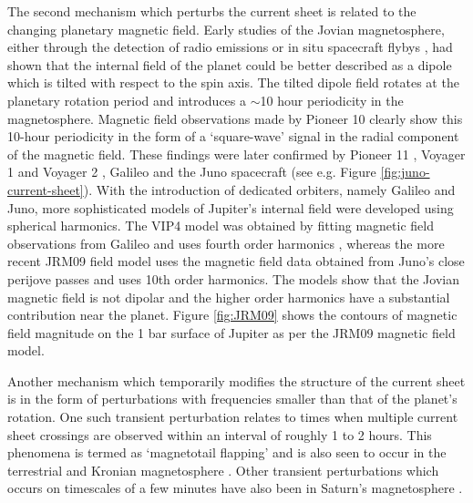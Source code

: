 The second mechanism which perturbs the current sheet is related to the changing planetary magnetic field. Early studies of the Jovian magnetosphere, either through the detection of radio emissions \cite{Carr1969TheJupiter} or in situ spacecraft flybys \cite{Smith1974The10}, had shown that the internal field of the planet could be better described as a dipole which is tilted with respect to the spin axis. The tilted dipole field rotates at the planetary rotation period and introduces a $\sim$10 hour periodicity in the magnetosphere. Magnetic field observations made by Pioneer 10 \cite{Smith1974The10} clearly show this 10-hour periodicity in the form of a `square-wave' signal in the radial component of the magnetic field. These findings were later confirmed by Pioneer 11 \cite{Smith1975Jupiters11}, Voyager 1 and Voyager 2 \cite{Behannon1981}, Galileo \cite{Khurana1992a, Khurana2005} and the Juno spacecraft (see e.g. Figure \ref{fig:juno-current-sheet}). With the introduction of dedicated orbiters, namely Galileo and Juno, more sophisticated models of Jupiter's internal field were developed using spherical harmonics. The VIP4 model was obtained by fitting magnetic field observations from Galileo and uses fourth order harmonics \cite{Connerney1998NewFootprint}, whereas the more recent JRM09 field model \cite{Connerney2018} uses the magnetic field data obtained from Juno's close perijove passes and uses 10th order harmonics. The models show that the Jovian magnetic field is not dipolar and the higher order harmonics have a substantial contribution near the planet. Figure \ref{fig:JRM09} shows the contours of magnetic field magnitude on the 1 bar surface of Jupiter as per the JRM09 magnetic field model. 

Another mechanism which temporarily modifies the structure of the current sheet is in the form of perturbations with frequencies smaller than that of the planet's rotation. One such transient perturbation relates to times when multiple current sheet crossings are observed within an interval of roughly 1 to 2 hours. This phenomena is termed as `magnetotail flapping' and is also seen to occur in the terrestrial and Kronian magnetosphere \cite{Volwerk2013ComparativeSaturn}. Other transient perturbations which occurs on timescales of a few minutes have also been in Saturn's magnetosphere \cite{Martin2017CassiniMagnetodisc}.  

